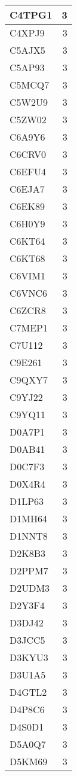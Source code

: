 \documentclass[
]{book}
\theoremstyle{definition}
\theoremstyle{definition}
\theoremstyle{definition}
\theoremstyle{definition}
\theoremstyle{remark}
\begin{document}
\begin{table}
\begin{tabular}{l|r}
\hline
C4TPG1 & 3\\
\hline
C4XPJ9 & 3\\
\hline
C5AJX5 & 3\\
\hline
C5AP93 & 3\\
\hline
C5MCQ7 & 3\\
\hline
C5W2U9 & 3\\
\hline
C5ZW02 & 3\\
\hline
C6A9Y6 & 3\\
\hline
C6CRV0 & 3\\
\hline
C6EFU4 & 3\\
\hline
C6EJA7 & 3\\
\hline
C6EK89 & 3\\
\hline
C6H0Y9 & 3\\
\hline
C6KT64 & 3\\
\hline
C6KT68 & 3\\
\hline
C6VIM1 & 3\\
\hline
C6VNC6 & 3\\
\hline
C6ZCR8 & 3\\
\hline
C7MEP1 & 3\\
\hline
C7U112 & 3\\
\hline
C9E261 & 3\\
\hline
C9QXY7 & 3\\
\hline
C9YJ22 & 3\\
\hline
C9YQ11 & 3\\
\hline
D0A7P1 & 3\\
\hline
D0AB41 & 3\\
\hline
D0C7F3 & 3\\
\hline
D0X4R4 & 3\\
\hline
D1LP63 & 3\\
\hline
D1MH64 & 3\\
\hline
D1NNT8 & 3\\
\hline
D2K8B3 & 3\\
\hline
D2PPM7 & 3\\
\hline
D2UDM3 & 3\\
\hline
D2Y3F4 & 3\\
\hline
D3DJ42 & 3\\
\hline
D3JCC5 & 3\\
\hline
D3KYU3 & 3\\
\hline
D3U1A5 & 3\\
\hline
D4GTL2 & 3\\
\hline
D4P8C6 & 3\\
\hline
D4S0D1 & 3\\
\hline
D5A0Q7 & 3\\
\hline
D5KM69 & 3\\

\end{tabular}
\end{table}
\end{document}
